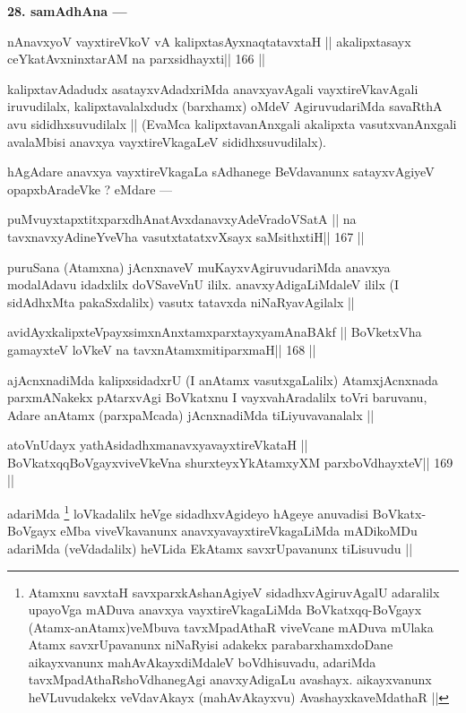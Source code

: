 \begin{artha}
{\bf 28. samAdhAna ---}
\end{artha}

\begin{shl}
nAnavxyoV vayxtireVkoV vA kalipxtasAyxnaqtatavxtaH ||
akalipxtasayx ceYkatAvxninxtarAM na parxsidhayxti\hfill || 166 ||
\end{shl}

\begin{artha}
kalipxtavAdadudx asatayxvAdadxriMda anavxyavAgali vayxtireVkavAgali 
iruvudilalx, kalipxtavalalxdudx (barxhamx) oMdeV AgiruvudariMda savaRthA avu sididhxsuvudilalx || (EvaMca kalipxtavanAnxgali akalipxta vasutxvanAnxgali avalaMbisi anavxya vayxtireVkagaLeV sididhxsuvudilalx).
\end{artha}

\begin{artha}
hAgAdare anavxya vayxtireVkagaLa sAdhanege BeVdavanunx satayxvAgiyeV opapxbAradeVke ? eMdare ---
\end{artha}

\begin{shl}
puMvuyxtapxtitxparxdhAnatAvxdanavxyAdeVradoVSatA ||
na tavxnavxyAdineYveVha vasutxtatatxvXsayx saMsithxtiH\hfill || 167 ||
\end{shl}

\begin{artha}
puruSana (Atamxna) jAcnxnaveV muKayxvAgiruvudariMda anavxya modalAdavu 
idadxlilx doVSaveVnU ililx. anavxyAdigaLiMdaleV ililx (I sidAdhxMta pakaSxdalilx) vasutx tatavxda niNaRyavAgilalx ||
\end{artha}

\begin{shl}
avidAyxkalipxteV\s payxsimxnAnxtamxparxtayxyamAnaBAkf ||
BoVketxVha gamayxteV loVkeV na tavxnAtamxmitiparxmaH\hfill || 168 ||
\end{shl}

\begin{artha}
ajAcnxnadiMda kalipxsidadxrU (I anAtamx vasutxgaLalilx) AtamxjAcnxnada 
parxmANakekx pAtarxvAgi BoVkatxnu I vayxvahAradalilx toVri baruvanu, Adare anAtamx (parxpaMcada) jAcnxnadiMda tiLiyuvavanalalx ||
\end{artha}

\begin{shl}
atoV\s nUdayx yathAsidadhxmanavxyavayxtireVkataH ||
BoVkatxqqBoVgayxviveVkeVna shurxteyxYkAtamxyXM parxboVdhayxteV\hfill || 169 ||
\end{shl}

\begin{artha}
adariMda \footnote[10]{Atamxnu savxtaH savxparxkAshanAgiyeV 
sidadhxvAgiruvAgalU adaralilx upayoVga mADuva anavxya vayxtireVkagaLiMda BoVkatxqq-BoVgayx (Atamx-anAtamx)veMbuva tavxMpadAthaR viveVcane mADuva mUlaka Atamx savxrUpavanunx niNaRyisi adakekx parabarxhamxdoDane aikayxvanunx mahAvAkayxdiMdaleV boVdhisuvadu, adariMda tavxMpadAthaRshoVdhanegAgi anavxyAdigaLu avashayx. aikayxvanunx heVLuvudakekx veVdavAkayx (mahAvAkayxvu) AvashayxkaveMdathaR ||} loVkadalilx heVge sidadhxvAgideyo hAgeye anuvadisi BoVkatx-BoVgayx eMba viveVkavanunx anavxyavayxtireVkagaLiMda mADikoMDu adariMda (veVdadalilx) heVLida EkAtamx savxrUpavanunx tiLisuvudu ||
\end{artha}

